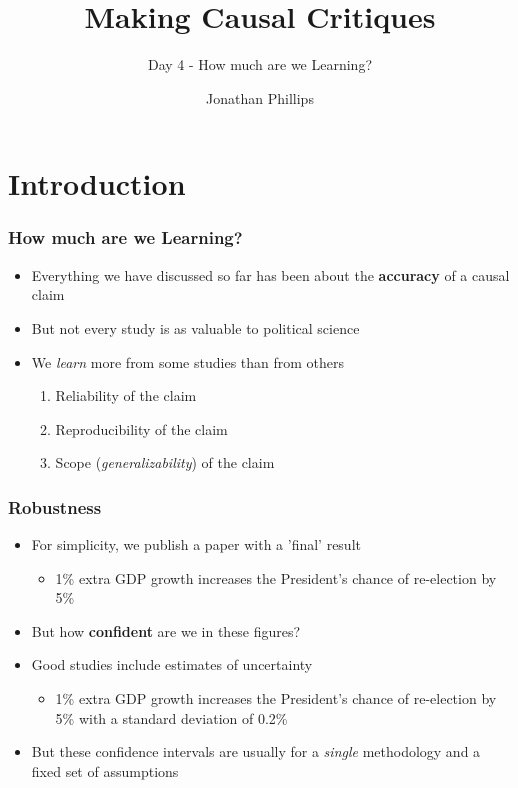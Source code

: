 \documentclass[xcolor=x11names,compress]{beamer}\usepackage[]{graphicx}\usepackage[]{color}
\title{Making Causal Critiques}
\subtitle{Day 4 - How much are we Learning?}
\author{Jonathan Phillips}
\renewcommand{\(}{\begin{columns}}
\renewcommand{\)}{\end{columns}}
\newcommand{\<}[1]{\begin{column}{#1}}
\renewcommand{\>}{\end{column}}
\begin{document}
\frame{\titlepage}

\section{Introduction}

\begin{frame}
\frametitle{How much are we Learning?}
\begin{itemize}
\item Everything we have discussed so far has been about the \textbf{accuracy} of a causal claim
\pause
\item But not every study is as valuable to political science
\pause
\item We \textit{learn} more from some studies than from others
\pause
\begin{enumerate}
\item Reliability of the claim
\pause
\item Reproducibility of the claim
\pause
\item Scope (\textit{generalizability}) of the claim
\end{enumerate}
\end{itemize}
\end{frame}

\begin{frame}
\frametitle{Robustness}
\begin{itemize}
\item For simplicity, we publish a paper with a 'final' result
\pause
\begin{itemize}
\item 1\% extra GDP growth increases the President's chance of re-election by 5\%
\pause
\end{itemize}
\item But how \textbf{confident} are we in these figures?
\pause
\item Good studies include estimates of uncertainty
\pause
\begin{itemize}
\item 1\% extra GDP growth increases the President's chance of re-election by 5\% with a standard deviation of 0.2\%
\pause
\end{itemize}
\item But these confidence intervals are usually for a \textit{single} methodology and a fixed set of assumptions
\end{itemize}
\end{frame}
\end{document}
